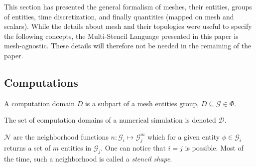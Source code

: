 \medskip

This section has presented the general formalism of meshes, their entities, groups of entities, time discretization, and finally quantities (mapped on mesh and scalars).
While the details about mesh and their topologies were useful to specify the following concepts, the Multi-Stencil Language presented in this paper is mesh-agnostic.
These details will therefore not be needed in the remaining of the paper.

\subsection{Computations}


\medskip
\begin{mydefs}
\item A computation domain $D$ is a subpart of a mesh entities group, $D \subseteq \mathcal{G} \in \Phi$.
\item The set of computation domains of a numerical simulation is denoted $\mathcal{D}$.
\item $\mathcal{N}$ are the neighborhood functions $n: \mathcal{G}_i \mapsto \mathcal{G}_j^m$ which for a given entity $\phi \in \mathcal{G}_i$ returns a set of $m$ entities in $\mathcal{G}_j$. One can notice that $i = j$ is possible. Most of the time, such a neighborhood is called a \emph{stencil shape}.
\end{mydefs}

